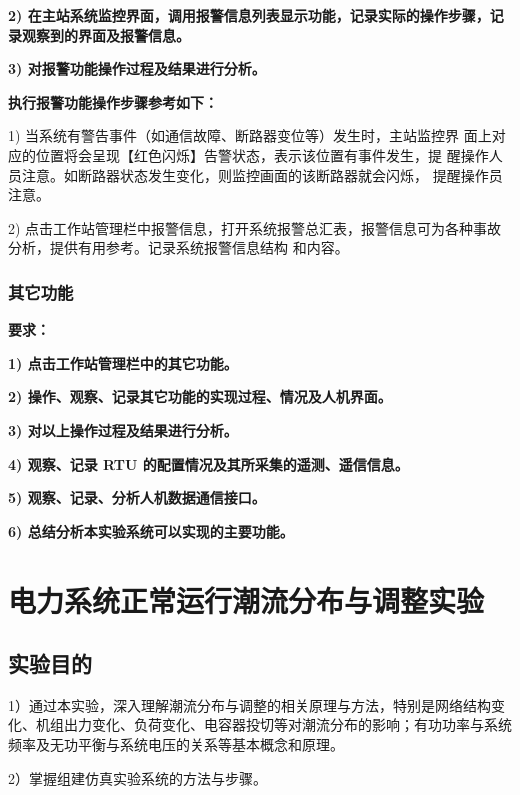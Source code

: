 \documentclass[a4paper]{ctexrep}
\begin{document}
                    \textbf{2) 在主站系统监控界面，调用报警信息列表显示功能，记录实际的操作步骤，记录观察到的界面及报警信息。}

                    \textbf{3) 对报警功能操作过程及结果进行分析。} 

                    \textbf{执行报警功能操作步骤参考如下：}

                    1) 当系统有警告事件（如通信故障、断路器变位等）发生时，主站监控界 面上对应的位置将会呈现【红色闪烁】告警状态，表示该位置有事件发生，提 醒操作人员注意。如断路器状态发生变化，则监控画面的该断路器就会闪烁， 提醒操作员注意。 
                    
                    2) 点击工作站管理栏中报警信息，打开系统报警总汇表，报警信息可为各种事故分析，提供有用参考。记录系统报警信息结构 和内容。

                \subsection{其它功能}
                    \textbf{要求：}

                    \textbf{1) 点击工作站管理栏中的其它功能。}

                    \textbf{2) 操作、观察、记录其它功能的实现过程、情况及人机界面。}

                    \textbf{3) 对以上操作过程及结果进行分析。}

                    \textbf{4) 观察、记录 RTU 的配置情况及其所采集的遥测、遥信信息。}

                    \textbf{5) 观察、记录、分析人机数据通信接口。}

                    \textbf{6) 总结分析本实验系统可以实现的主要功能。}

        
        \chapter{电力系统正常运行潮流分布与调整实验}
            \graphicspath{{figures_2/}}
            \section{实验目的}
                1）通过本实验，深入理解潮流分布与调整的相关原理与方法，特别是网络结构变化、机组出力变化、负荷变化、电容器投切等对潮流分布的影响；有功功率与系统频率及无功平衡与系统电压的关系等基本概念和原理。
                
                2）掌握组建仿真实验系统的方法与步骤。 
                
\end{document}
